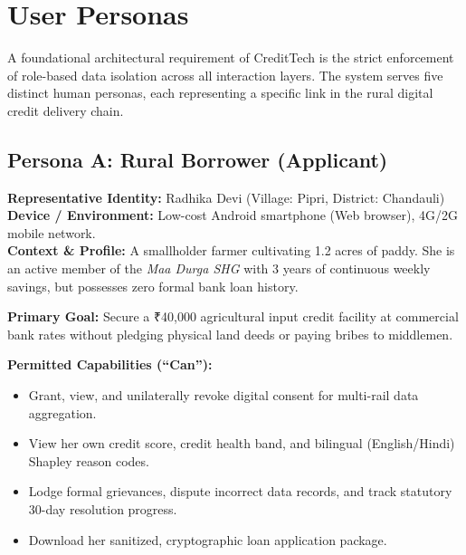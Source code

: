 \documentclass[11pt,a4paper,oneside]{report}
\begin{document}



\chapter{User Personas}
\label{chap:user_personas}

A foundational architectural requirement of CreditTech is the strict enforcement of role-based data isolation across all interaction layers. The system serves five distinct human personas, each representing a specific link in the rural digital credit delivery chain.

\section{Persona A: Rural Borrower (Applicant)}
\noindent\textbf{Representative Identity:} Radhika Devi (Village: Pipri, District: Chandauli)\\
\textbf{Device / Environment:} Low-cost Android smartphone (Web browser), 4G/2G mobile network.\\
\textbf{Context \& Profile:} A smallholder farmer cultivating 1.2 acres of paddy. She is an active member of the \textit{Maa Durga SHG} with 3 years of continuous weekly savings, but possesses zero formal bank loan history.

\vspace{0.2cm}
\noindent\textbf{Primary Goal:} Secure a ₹40,000 agricultural input credit facility at commercial bank rates without pledging physical land deeds or paying bribes to middlemen.

\vspace{0.2cm}
\noindent\textbf{Permitted Capabilities (``Can''):}
\begin{itemize}[leftmargin=1.5em, itemsep=1pt]
  \item Grant, view, and unilaterally revoke digital consent for multi-rail data aggregation.
  \item View her own credit score, credit health band, and bilingual (English/Hindi) Shapley reason codes.
  \item Lodge formal grievances, dispute incorrect data records, and track statutory 30-day resolution progress.
  \item Download her sanitized, cryptographic loan application package.
\end{itemize}
\end{document}
